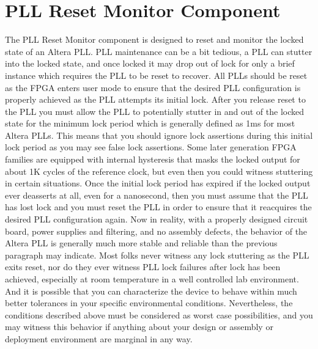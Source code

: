 \documentclass{article}
\begin{document}
\section*{PLL Reset Monitor Component}
\begin{flushleft}
\noindent
The PLL Reset Monitor component is designed to reset and monitor the locked state of an Altera PLL.
\newline
\newline
PLL maintenance can be a bit tedious, a PLL can stutter into the locked state, and once locked it may drop out of lock for only a brief instance which requires the PLL to be reset to recover.  All PLLs should be reset as the FPGA enters user mode to ensure that the desired PLL configuration is properly achieved as the PLL attempts its initial lock.  After you release reset to the PLL you must allow the PLL to potentially stutter in and out of the locked state for the minimum lock period which is generally defined as 1ms for most Altera PLLs.  This means that you should ignore lock assertions during this initial lock period as you may see false lock assertions.  Some later generation FPGA families are equipped with internal hysteresis that masks the locked output for about 1K cycles of the reference clock, but even then you could witness stuttering in certain situations.  Once the initial lock period has expired if the locked output ever deasserts at all, even for a nanosecond, then you must assume that the PLL has lost lock and you must reset the PLL in order to ensure that it reacquires the desired PLL configuration again.
\newline
\newline
Now in reality, with a properly designed circuit board, power supplies and filtering, and no assembly defects, the behavior of the Altera PLL is generally much more stable and reliable than the previous paragraph may indicate.  Most folks never witness any lock stuttering as the PLL exits reset, nor do they ever witness PLL lock failures after lock has been achieved, especially at room temperature in a well controlled lab environment.  And it is possible that you can characterize the device to behave within much better tolerances in your specific environmental conditions.  Nevertheless, the conditions described above must be considered as worst case possibilities, and you may witness this behavior if anything about your design or assembly or deployment environment are marginal in any way.

\end{flushleft}
\end{document}
